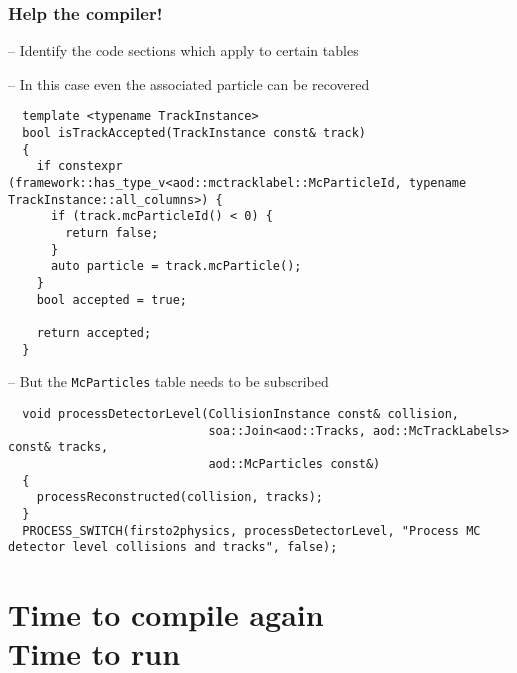 \documentclass[14pt,aspectratio=169,t]{beamer}
\begin{document}
\begin{frame}[fragile]
  \frametitle{Help the compiler!}
  -- {\color{blue} Identify the code sections which apply to certain tables}\par
  -- {\color{blue} In this case even the associated particle can be recovered}\par
  {\tiny\color{blue}
  \vspace{-0.0in}
  \begin{verbatim}
  template <typename TrackInstance>
  bool isTrackAccepted(TrackInstance const& track)
  {
    if constexpr (framework::has_type_v<aod::mctracklabel::McParticleId, typename TrackInstance::all_columns>) {
      if (track.mcParticleId() < 0) {
        return false;
      }
      auto particle = track.mcParticle();
    }
    bool accepted = true;

    return accepted;
  }
  \end{verbatim}}
  \vspace{-0.2in}
  -- {\color{blue} But the \verb|McParticles| table needs to be subscribed}\par
  {\tiny\color{blue}
  \vspace{-0.0in}
  \begin{verbatim}
  void processDetectorLevel(CollisionInstance const& collision, 
                            soa::Join<aod::Tracks, aod::McTrackLabels> const& tracks, 
                            aod::McParticles const&)
  {
    processReconstructed(collision, tracks);
  }
  PROCESS_SWITCH(firsto2physics, processDetectorLevel, "Process MC detector level collisions and tracks", false);
  \end{verbatim}}
\end{frame}

\section{Time to compile again\\Time to run}
\end{document}
